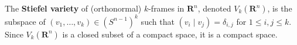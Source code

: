 The \textbf{Stiefel variety} of (orthonormal) $k$-frames in $\mathbf{R}^n$, denoted $V_k(\mathbf{R}^n)$, is the subspace of $(v_1, \ldots, v_k) \in (S^{n-1})^k$ such that $(v_i \mid v_j) = \delta_{i,j}$ for $1 \leq i, j \leq k$. Since $V_k(\mathbf{R}^n)$ is a closed subset of a compact space, it is a compact space.
